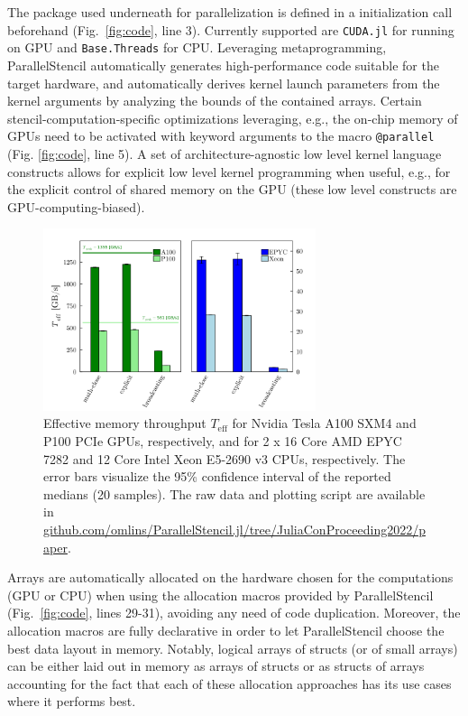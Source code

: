 \documentclass{juliacon}
\begin{document}
The package used underneath for parallelization is defined in a initialization call beforehand (Fig.~\ref{fig:code}, line 3). Currently supported are \texttt{CUDA.jl} \cite{besard2018effective} for running on GPU and \texttt{Base.Threads} for CPU. Leveraging metaprogramming, ParallelStencil automatically generates high-performance code suitable for the target hardware, and automatically derives kernel launch parameters from the kernel arguments by analyzing the bounds of the contained arrays. Certain stencil-computation-specific optimizations leveraging, e.g., the on-chip memory of GPUs need to be activated with keyword arguments to the macro \texttt{@parallel} (Fig. \ref{fig:code}, line 5). A set of architecture-agnostic low level kernel language constructs allows for explicit low level kernel programming when useful, e.g., for the explicit control of shared memory on the GPU (these low level constructs are GPU-computing-biased). 

\begin{figure}[t]
    \centerline{\includegraphics[width=8cm]{julia_xpu_Teff.png}}
    \caption{Effective memory throughput $T_\mathrm{eff}$ for Nvidia Tesla A100 SXM4 and P100 PCIe GPUs, respectively, and for 2 x 16 Core AMD EPYC 7282 and 12 Core Intel Xeon E5-2690 v3 CPUs, respectively. The error bars visualize the 95\% confidence interval of the reported medians (20 samples). The raw data and plotting script are available in \url{github.com/omlins/ParallelStencil.jl/tree/JuliaConProceeding2022/paper}.}
	\label{fig:performance}
\end{figure}

Arrays are automatically allocated on the hardware chosen for the computations (GPU or CPU) when using the allocation macros provided by ParallelStencil (Fig.~\ref{fig:code}, lines 29-31), avoiding any need of code duplication. Moreover, the allocation macros are fully declarative in order to let ParallelStencil choose the best data layout in memory. Notably, logical arrays of structs (or of small arrays) can be either laid out in memory as arrays of structs or as structs of arrays accounting for the fact that each of these allocation approaches has its use cases where it performs best.
\end{document}
